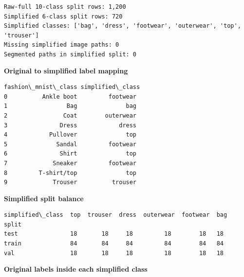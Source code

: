 \documentclass[11pt]{article}
\begin{document}
    \begin{Verbatim}[commandchars=\\\{\}]
Raw-full 10-class split rows: 1,200
Simplified 6-class split rows: 720
Simplified classes: ['bag', 'dress', 'footwear', 'outerwear', 'top', 'trouser']
Missing simplified image paths: 0
Segmented paths in simplified split: 0
    \end{Verbatim}

    \textbf{Original to simplified label mapping}

    
    
    \begin{Verbatim}[commandchars=\\\{\}]
  fashion\_mnist\_class simplified\_class
0          Ankle boot         footwear
1                 Bag              bag
2                Coat        outerwear
3               Dress            dress
4            Pullover              top
5              Sandal         footwear
6               Shirt              top
7             Sneaker         footwear
8         T-shirt/top              top
9             Trouser          trouser
    \end{Verbatim}

    
    \textbf{Simplified split balance}

    
    
    \begin{Verbatim}[commandchars=\\\{\}]
simplified\_class  top  trouser  dress  outerwear  footwear  bag
split                                                          
test               18       18     18         18        18   18
train              84       84     84         84        84   84
val                18       18     18         18        18   18
    \end{Verbatim}

    
    \textbf{Original labels inside each simplified class}

    
    
\end{document}
